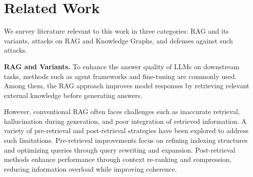 \section{Related Work}

We survey literature relevant to this work in three categories: RAG and its variants, attacks on RAG and Knowledge Graphs, and defenses against such attacks.

\vspace{2pt}
{\bf RAG and Variants.} 
To enhance the answer quality of LLMs on downstream tasks, methods such as agent frameworks and fine-tuning are commonly used.
Among them, the RAG approach improves model responses by retrieving relevant external knowledge before generating answers.

However, conventional RAG often faces challenges such as inaccurate retrieval, hallucination during generation, and poor integration of retrieved information. 
A variety of pre-retrieval and post-retrieval strategies have been explored to address such limitations. Pre-retrieval improvements focus on refining indexing structures and optimizing queries through query rewriting and expansion. Post-retrieval methods enhance performance through context re-ranking and compression, reducing information overload while improving coherence. 






